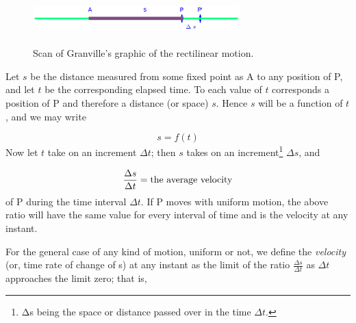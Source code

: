\begin{figure}[h!]
\begin{minipage}{\textwidth}
\begin{center}
\includegraphics[height=2cm,width=8cm]{linear-motion2.eps}
\end{center}
\end{minipage}
\caption{Scan of Granville's graphic of the rectilinear motion.}
\label{fig:linear-motion}
\end{figure}

Let $s$ be the distance measured from some fixed point as A to any 
position of P, and let $t$ be the corresponding elapsed time. 
To each value of $t$ corresponds a position of P and 
therefore a distance (or space) $s$. Hence $s$ will be a 
function of $t$, and we may write

\[
s = f(t)
\]
Now let $t$ take on an increment $\Delta t$; then $s$ takes on an 
increment\footnote{Δs being the space or distance passed 
over in the time $\Delta t$.} $\Delta s$, and

\begin{equation}
\frac{\Delta s}{\Delta t} = {\rm the\ average\ velocity}
\label{eqn:A-70}
\end{equation}	
of P during the time interval $\Delta t$. If P moves with uniform 
motion, the above ratio will have the same value for every 
interval of time and is the velocity at any instant.

For the general case of any kind of motion, uniform 
or not, we define the {\it velocity} (or, time rate of change of s) 
at any instant as the limit of the ratio $\frac{\Delta s}{\Delta t}$ as 
$\Delta t$ approaches the limit zero; that is, 

